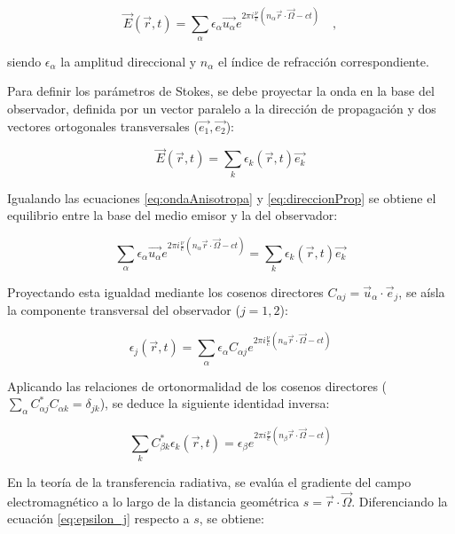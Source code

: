 \begin{equation}
    \label{eq:ondaAnisotropa}
    \vec{E} (\vec{r}, t) = \sum_\alpha \epsilon_\alpha \vec{u_\alpha} e^{2 \pi i \frac{\nu}{c}(n_\alpha \vec{r} \cdot \vec{\Omega} - ct)} \quad,
\end{equation}

siendo $\epsilon_\alpha$ la amplitud direccional y $n_\alpha$ el índice de refracción correspondiente. 

Para definir los parámetros de Stokes, se debe proyectar la onda en la base del observador, definida por un vector paralelo a la dirección de propagación y dos vectores ortogonales transversales ($\vec{e_1}, \vec{e_2}$):

\begin{equation}
    \label{eq:direccionProp}
    \vec{E} (\vec{r}, t) = \sum_k \epsilon_k (\vec{r}, t) \vec{e_k} 
\end{equation}

Igualando las ecuaciones \ref{eq:ondaAnisotropa} y \ref{eq:direccionProp} se obtiene el equilibrio entre la base del medio emisor y la del observador:

\begin{equation}
    \label{eq:igualandoOndas}
    \sum_\alpha \epsilon_\alpha \vec{u_\alpha} e^{2 \pi i \frac{\nu}{c}(n_\alpha \vec{r} \cdot \vec{\Omega} - ct)} = \sum_k \epsilon_k (\vec{r}, t) \vec{e_k}
\end{equation}

Proyectando esta igualdad mediante los cosenos directores $C_{\alpha j} = \vec{u}_\alpha \cdot \vec{e}_j$, se aísla la componente transversal del observador ($j=1,2$):

\begin{equation}
    \epsilon_j(\vec{r},t) = \sum_\alpha \epsilon_\alpha C_{\alpha j} e^{2\pi i \frac{\nu}{c}(n_\alpha \vec{r} \cdot \vec{\Omega} - ct)}
    \label{eq:epsilon_j}
\end{equation}

Aplicando las relaciones de ortonormalidad de los cosenos directores ($\sum_\alpha C_{\alpha j}^* C_{\alpha k} = \delta_{jk}$), se deduce la siguiente identidad inversa:

\begin{equation}
    \sum_k C_{\beta k}^* \epsilon_k(\vec{r},t) = \epsilon_\beta e^{2\pi i \frac{\nu}{c}(n_\beta \vec{r} \cdot \vec{\Omega} - ct)}
    \label{eq:identidad_inversa}
\end{equation}

En la teoría de la transferencia radiativa, se evalúa el gradiente del campo electromagnético a lo largo de la distancia geométrica $s = \vec{r} \cdot \vec{\Omega}$. Diferenciando la ecuación \ref{eq:epsilon_j} respecto a $s$, se obtiene:

